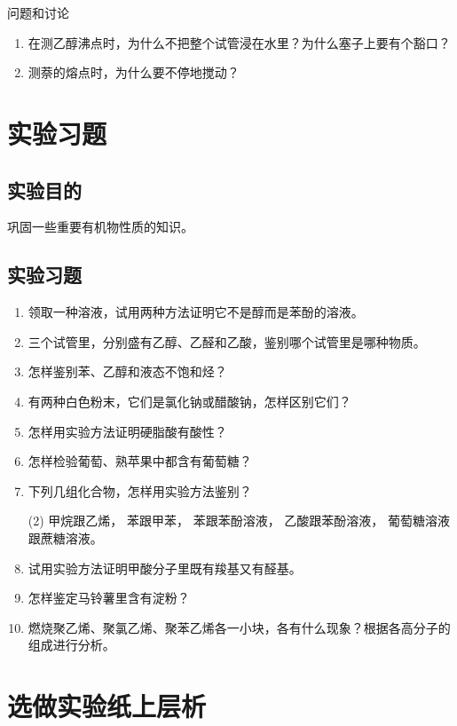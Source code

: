 \begin{Theorem}{问题和讨论}
\begin{enumerate}[1.]
  \item 在测乙醇沸点时，为什么不把整个试管浸在水里？为什么塞子上要有个豁口？
  \item 测萘的熔点时，为什么要不停地搅动？
\end{enumerate}
\end{Theorem}

\section{实验习题}
\subsection*{实验目的}
巩固一些重要有机物性质的知识。

\subsection*{实验习题}
\begin{enumerate}[1.]
  \item 领取一种溶液，试用两种方法证明它不是醇而是苯酚的溶液。
  \item 三个试管里，分别盛有乙醇、乙醛和乙酸，鉴别哪个试管里是哪种物质。
  \item 怎样鉴别苯、乙醇和液态不饱和烃？
  \item 有两种白色粉末，它们是氯化钠或醋酸钠，怎样区别它们？
  \item 怎样用实验方法证明硬脂酸有酸性？
  \item 怎样检验葡萄、熟苹果中都含有葡萄糖？
  \item 下列几组化合物，怎样用实验方法鉴别？
  \begin{tasks}[item-indent=5em](2)
    \task 甲烷跟乙烯，
    \task 苯跟甲苯，
    \task 苯跟苯酚溶液，
    \task 乙酸跟苯酚溶液，
    \task* 葡萄糖溶液跟蔗糖溶液。
  \end{tasks}
  \item 试用实验方法证明甲酸分子里既有羧基又有醛基。
  \item 怎样鉴定马铃薯里含有淀粉？
  \item 燃烧聚乙烯、聚氯乙烯、聚苯乙烯各一小块，各有什么现象？根据各高分子的组成进行分析。
\end{enumerate}

\section*{选做实验\texorpdfstring{\quad}{ }纸上层析}
